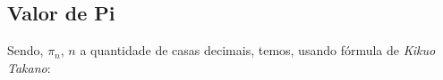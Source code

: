 \begin{appendixenv}[Apêndices]
    \section{Valor de Pi} \label{apx:pi-number}

    Sendo, $\pi_n$, $n$ a quantidade de casas decimais, temos, usando fórmula de \textit{Kikuo Takano}:

    

    \cleardoublepage
    
\end{appendixenv}